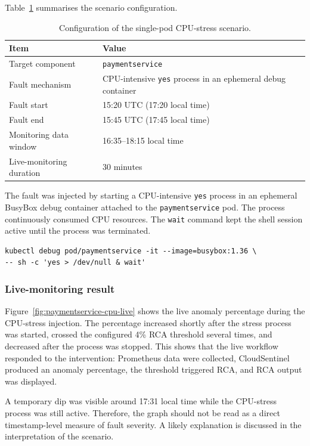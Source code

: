 Table~\ref{tab:paymentservice-cpu-setup} summarises the scenario configuration.

\begin{table}[htbp]
    \centering
    \small
    \caption{Configuration of the single-pod CPU-stress scenario.}
    \label{tab:paymentservice-cpu-setup}
    \begin{tabular}{l l}
        \toprule
        \textbf{Item} & \textbf{Value} \\
        \midrule
        Target component & \texttt{paymentservice} \\
        Fault mechanism & CPU-intensive \texttt{yes} process in an ephemeral debug container \\
        Fault start & 15:20 UTC (17:20 local time) \\
        Fault end & 15:45 UTC (17:45 local time) \\
        Monitoring data window & 16:35--18:15 local time \\
        Live-monitoring duration & 30 minutes \\
        \bottomrule
    \end{tabular}
\end{table}

The fault was injected by starting a CPU-intensive \texttt{yes} process in an ephemeral BusyBox debug container attached to the \texttt{paymentservice} pod. The process continuously consumed CPU resources. The \texttt{wait} command kept the shell session active until the process was terminated.

\begin{verbatim}
kubectl debug pod/paymentservice -it --image=busybox:1.36 \
-- sh -c 'yes > /dev/null & wait'
\end{verbatim}

\subsubsection{Live-monitoring result}
Figure~\ref{fig:paymentservice-cpu-live} shows the live anomaly percentage during the CPU-stress injection. The percentage increased shortly after the stress process was started, crossed the configured 4\% RCA threshold several times, and decreased after the process was stopped. This shows that the live workflow responded to the intervention: Prometheus data were collected, CloudSentinel produced an anomaly percentage, the threshold triggered RCA, and RCA output was displayed.

A temporary dip was visible around 17:31 local time while the CPU-stress process was still active. Therefore, the graph should not be read as a direct timestamp-level measure of fault severity. A likely explanation is discussed in the interpretation of the scenario.

